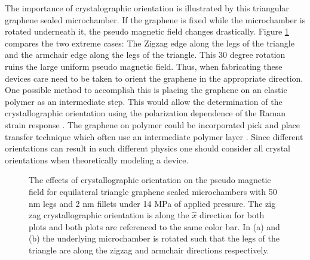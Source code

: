 The importance of crystalographic orientation is illustrated by this triangular graphene sealed microchamber.
If the graphene is fixed while the microchamber is rotated underneath it, the pseudo magnetic field changes drastically.
Figure \ref{fig:PVP:Triangle_rot} compares the two extreme cases: The Zigzag edge along the legs of the triangle and the armchair edge along the legs of the triangle.
This 30 degree rotation ruins the large uniform pseudo magnetic field.
Thus, when fabricating these devices care need to be taken to orient the graphene in the appropriate direction.
One possible method to accomplish this is placing the graphene on an elastic polymer as an intermediate step.
This would allow the determination of the crystallographic orientation using the polarization dependence of the Raman strain response \cite{Huang2009}.
The graphene on polymer could be incorporated pick and place transfer technique which often use an intermediate polymer layer \cite{Dean2010,Zomer2011}.
Since different orientations can result in such different physics one should consider all crystal orientations when theoretically modeling a device.

\begin{figure}
  \begin{center}
  
  \end{center}
  \caption[The effects of crystallographic orientation on the pseudo magnetic field]{\label{fig:PVP:Triangle_rot} The effects of crystallographic orientation on the pseudo magnetic field for equilateral triangle graphene sealed microchambers with 50 nm legs and 2 nm fillets under 14 MPa of applied pressure. The zig zag crystallographic orientation is along the $\hat{x}$ direction for both plots and both plots are referenced to the same color bar.  In (a) and (b) the underlying microchamber is rotated such that the legs of the triangle are along the zigzag and armchair directions respectively.}
\end{figure}

